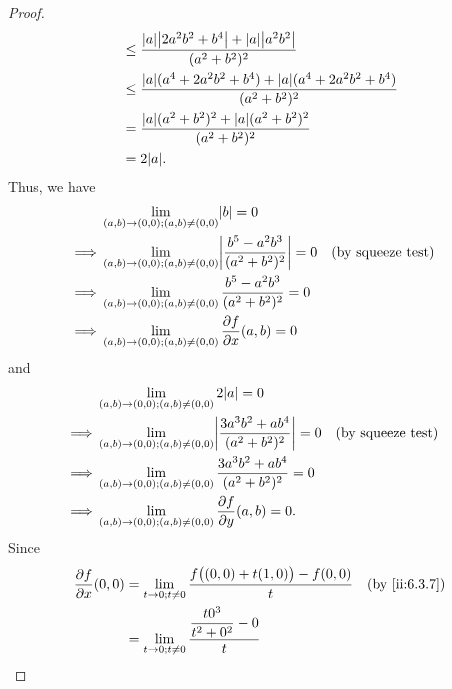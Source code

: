 \begin{proof}
\begin{align*}
                                                   & \leq \dfrac{\abs{a} \abs{2 a^2 b^2 + b^4} + \abs{a} \abs{a^2 b^2}}{(a^2 + b^2)^2}             \\
                                                   & \leq \dfrac{\abs{a} (a^4 + 2 a^2 b^2 + b^4) + \abs{a} (a^4 + 2 a^2 b^2 + b^4)}{(a^2 + b^2)^2} \\
                                                   & = \dfrac{\abs{a} (a^2 + b^2)^2 + \abs{a} (a^2 + b^2)^2}{(a^2 + b^2)^2}                        \\
                                                   & = 2 \abs{a}.
  \end{align*}
  Thus, we have
  \begin{align*}
             & \lim_{(a, b) \to (0, 0) ; (a, b) \neq (0, 0)} \abs{b} = 0                                                                  \\
    \implies & \lim_{(a, b) \to (0, 0) ; (a, b) \neq (0, 0)} \abs{\dfrac{b^5 - a^2 b^3}{(a^2 + b^2)^2}} = 0 &  & \text{(by squeeze test)} \\
    \implies & \lim_{(a, b) \to (0, 0) ; (a, b) \neq (0, 0)} \dfrac{b^5 - a^2 b^3}{(a^2 + b^2)^2} = 0                                     \\
    \implies & \lim_{(a, b) \to (0, 0) ; (a, b) \neq (0, 0)} \dfrac{\partial f}{\partial x}(a, b) = 0
  \end{align*}
  and
  \begin{align*}
             & \lim_{(a, b) \to (0, 0) ; (a, b) \neq (0, 0)} 2 \abs{a} = 0                                                                    \\
    \implies & \lim_{(a, b) \to (0, 0) ; (a, b) \neq (0, 0)} \abs{\dfrac{3 a^3 b^2 + a b^4}{(a^2 + b^2)^2}} = 0 &  & \text{(by squeeze test)} \\
    \implies & \lim_{(a, b) \to (0, 0) ; (a, b) \neq (0, 0)} \dfrac{3 a^3 b^2 + a b^4}{(a^2 + b^2)^2} = 0                                     \\
    \implies & \lim_{(a, b) \to (0, 0) ; (a, b) \neq (0, 0)} \dfrac{\partial f}{\partial y}(a, b) = 0.
  \end{align*}
  Since
  \begin{align*}
    \dfrac{\partial f}{\partial x}(0, 0) & = \lim_{t \to 0 ; t \neq 0} \dfrac{f\big((0, 0) + t(1, 0)\big) - f(0, 0)}{t} &  & \by{ii:6.3.7} \\
                                         & = \lim_{t \to 0 ; t \neq 0} \dfrac{\dfrac{t 0^3}{t^2 + 0^2} - 0}{t}                             \\

\end{align*}
\end{proof}

